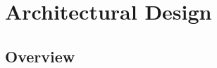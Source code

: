 \clearpage
\section{Architectural Design}
\subsection{Overview}

\clearpage

\clearpage

\clearpage

\clearpage

\clearpage

